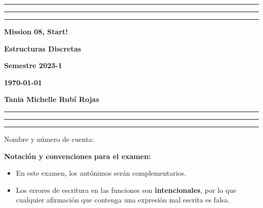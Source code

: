 \documentclass[12pt, a4paper]{exam}
\begin{document}
    \centering
    \hrule \hrule \hrule 
    \vspace{5mm}
    \begin{minipage}[c]{0.8\textwidth}
        \begin{center}
            {\large\textbf{Mission 08, Start!} \par
            \large \textbf{Estructuras Discretas} \par
            \large \textbf{Semestre 2023-1} \par
            \large \textbf{\today}	\par}
        \end{center}
    \end{minipage}

    \vspace{0.2in}
    \noindent
    \textbf{Tania Michelle Rubí Rojas}
    \vspace{2mm}
    \hrule \hrule \hrule 

    \vspace{5mm}
    \noindent
    Nombre y número de cuenta: \hrulefill\

    \textbf{Notación y convenciones para el examen:}
    {\tiny
    \begin{multicols}{2}
    \begin{itemize}\setlength\itemsep{0em}  
      \item En este examen, los antónimos serán complementarios.

      \item Los errores de escritura en las funciones son {\bf intencionales}, 
      por lo que cualquier afirmación que contenga una expresión mal escrita 
      es falsa.
    \end{itemize}
    \end{multicols}
    }
\end{document}
